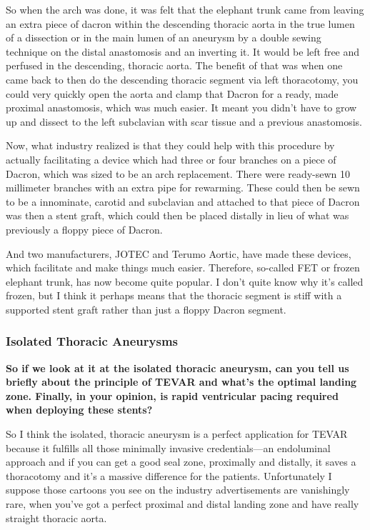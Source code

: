 \documentclass[
]{book}
\begin{document}
So when the arch was done, it was felt that the elephant trunk came from
leaving an extra piece of dacron within the descending thoracic aorta in
the true lumen of a dissection or in the main lumen of an aneurysm by a
double sewing technique on the distal anastomosis and an inverting it.
It would be left free and perfused in the descending, thoracic aorta.
The benefit of that was when one came back to then do the descending
thoracic segment via left thoracotomy, you could very quickly open the
aorta and clamp that Dacron for a ready, made proximal anastomosis,
which was much easier. It meant you didn't have to grow up and dissect
to the left subclavian with scar tissue and a previous anastomosis.

Now, what industry realized is that they could help with this procedure
by actually facilitating a device which had three or four branches on a
piece of Dacron, which was sized to be an arch replacement. There were
ready-sewn 10 millimeter branches with an extra pipe for rewarming.
These could then be sewn to be a innominate, carotid and subclavian and
attached to that piece of Dacron was then a stent graft, which could
then be placed distally in lieu of what was previously a floppy piece of
Dacron.

And two manufacturers, JOTEC and Terumo Aortic, have made these devices,
which facilitate and make things much easier. Therefore, so-called FET
or frozen elephant trunk, has now become quite popular. I don't quite
know why it's called frozen, but I think it perhaps means that the
thoracic segment is stiff with a supported stent graft rather than just
a floppy Dacron segment.

\hypertarget{isolated-thoracic-aneurysms}{%
\subsubsection{Isolated Thoracic Aneurysms}\label{isolated-thoracic-aneurysms}}

\textbf{So if we look at it at the isolated thoracic aneurysm, can you tell us
briefly about the principle of TEVAR and what's the optimal landing
zone. Finally, in your opinion, is rapid ventricular pacing required
when deploying these stents?}

So I think the isolated, thoracic aneurysm is a perfect application for
TEVAR because it fulfills all those minimally invasive credentials---an
endoluminal approach and if you can get a good seal zone, proximally and
distally, it saves a thoracotomy and it's a massive difference for the
patients. Unfortunately I suppose those cartoons you see on the industry
advertisements are vanishingly rare, when you've got a perfect proximal
and distal landing zone and have really straight thoracic aorta.
\end{document}
